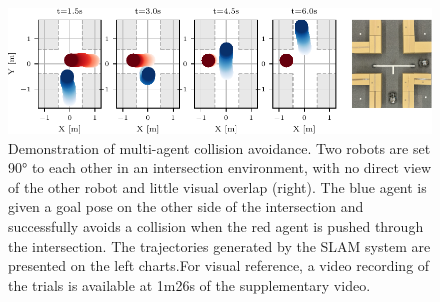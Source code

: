 \begin{figure}[h]
    \centering
    \captionsetup{format=plain, skip=0.5em}
    \includegraphics[width=0.9\linewidth]{figures/mar25_1_tracer_graph.pdf}

    \caption{Demonstration of multi-agent collision avoidance. Two robots are set 90° to each other in an intersection environment, with no direct view of the other robot and little visual overlap (right). The blue agent is given a goal pose on the other side of the intersection and successfully avoids a collision when the red agent is pushed through the intersection. The trajectories generated by the SLAM system are presented on the left charts.\captionbreak For visual reference, a video recording of the trials is available at 1m26s of the supplementary video\protect\footnotemark[1].}
    \label{fig:collision-avoidance}
\end{figure}

